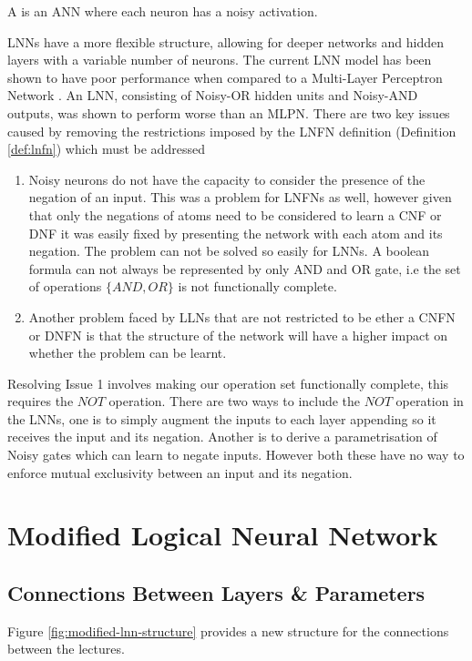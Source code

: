 \begin{definition}
	A  is an ANN where each neuron has a noisy activation.
\end{definition}

LNNs have a more flexible structure, allowing for deeper networks and hidden layers with a variable number of neurons. The current LNN model has been shown to have poor performance when compared to a Multi-Layer Perceptron Network \cite{LearningLogicalActivations}. An LNN, consisting of Noisy-OR hidden units and Noisy-AND outputs, was shown to perform worse than an MLPN. There are two key issues caused by removing the restrictions imposed by the LNFN definition (Definition \ref{def:lnfn}) which must be addressed 

\begin{enumerate}
	\item Noisy neurons do not have the capacity to consider the presence of the negation of an input. This was a problem for LNFNs as well, however given that only the negations of atoms need to be considered to learn a CNF or DNF it was easily fixed by presenting the network with each atom and its negation. The problem can not be solved so easily for LNNs. A boolean formula can not always be represented by only AND and OR gate, i.e the set of operations $\{AND, OR\}$ is not functionally complete. 
	
	\item Another problem faced by LLNs that are not restricted to be ether a CNFN or DNFN is that the structure of the network will have a higher impact on whether the problem can be learnt. 
\end{enumerate}

Resolving Issue 1 involves making our operation set functionally complete, this requires the $NOT$ operation. There are two ways to include the $NOT$ operation in the LNNs, one is to simply augment the inputs to each layer appending so it receives the input and its negation. Another is to derive a parametrisation of Noisy gates which can learn to negate inputs. However both these have no way to enforce mutual exclusivity between an input and its negation.

\section{Modified Logical Neural Network} \label{sec:modified-lnn}
\subsection{Connections Between Layers \& Parameters}
Figure \ref{fig:modified-lnn-structure} provides a new structure for the connections between the lectures.

